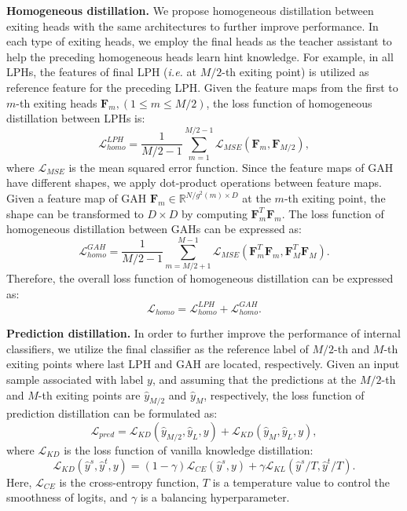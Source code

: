 \textbf{Homogeneous distillation. }
We propose homogeneous distillation between exiting heads with the same architectures to further improve performance. 
In each type of exiting heads, we employ the final heads as the teacher assistant to help the preceding homogeneous heads learn hint knowledge. 
For example, 
in all LPHs, the features of final LPH (\textit{i.e.} at $M/2$-th exiting point) is utilized as reference feature for the preceding LPH. 
Given the feature maps from the first to $m$-th exiting heads $\mathbf{F}_m, (1\leq m\leq M/2)$, 
the loss function of homogeneous distillation between LPHs is:
\begin{equation}
  \mathcal{L}_{homo}^{LPH}=\frac{1}{M/2-1}\sum_{m = 1}^{M/2-1} \mathcal{L}_{MSE}(\mathbf{F}_m, \mathbf{F}_{M/2}), 
\end{equation}
where $\mathcal{L}_{MSE}$ is the mean squared error function. 
Since the feature maps of GAH have different shapes, we apply dot-product operations between feature maps. 
Given a feature map of GAH $\mathbf{F}_m\in \mathbb{R}^{N/g^2(m) \times D}$ at the $m$-th exiting point, 
the shape can be transformed to $D\times D$ by computing $\mathbf{F}_m^T\mathbf{F}_m$. 
The loss function of homogeneous distillation between GAHs can be expressed as: 
\begin{equation}
  \mathcal{L}_{homo}^{GAH}=\frac{1}{M/2-1}\sum_{m = M/2+1}^{M-1} \mathcal{L}_{MSE}(\mathbf{F}_m^T\mathbf{F}_m, \mathbf{F}_{M}^T\mathbf{F}_{M}). 
\end{equation}
Therefore, the overall loss function of homogeneous distillation can be expressed as: 
\begin{equation}
  \mathcal{L}_{homo}=\mathcal{L}_{homo}^{LPH}+\mathcal{L}_{homo}^{GAH}. 
\end{equation}



\textbf{Prediction distillation. }
In order to further improve the performance of internal classifiers, 
we utilize the final classifier as the reference label of $M/2$-th and $M$-th exiting points where last LPH and GAH are located, respectively. 
Given an input sample associated with label $y$, and assuming that the predictions at the $M/2$-th and $M$-th exiting points are $\hat{y}_{M/2}$ and $\hat{y}_{M}$, respectively, 
the loss function of prediction distillation can be formulated as: 
\begin{equation}
  \mathcal{L}_{pred}=\mathcal{L}_{KD}(\hat{y}_{M/2}, \hat{y}_{L}, y)+\mathcal{L}_{KD}(\hat{y}_{M}, \hat{y}_{L}, y),
\end{equation}
where $\mathcal{L}_{KD}$ is the loss function of vanilla knowledge distillation: 
\begin{equation}
  \mathcal{L}_{KD}(\hat{y}^s, \hat{y}^t, y) = (1-\gamma)\mathcal{L}_{CE}(\hat{y}^s, y) + \gamma \mathcal{L}_{KL}(\hat{y}^s/T, \hat{y}^t/T).  
\end{equation}
Here, $\mathcal{L}_{CE}$ is the cross-entropy function, 
$T$ is a temperature value to control the smoothness of logits, 
and $\gamma$ is a balancing hyperparameter. 

